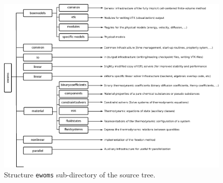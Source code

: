 \begin{landscape}
\begin{figure}[hbt]
  \centering
  \includegraphics[width=\linewidth, keepaspectratio]{EPS/ewoms_structure.eps}
  \caption{
    \label{fig:ewoms-structure}
    Structure \texttt{ewoms} sub-directory of the \eWoms source tree.
  }
\end{figure}
\end{landscape}

